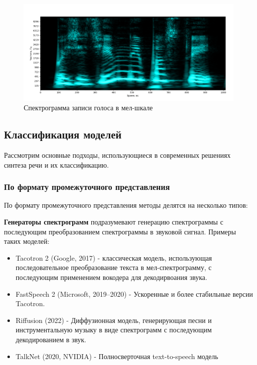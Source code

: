 \begin{figure}
  \centering
  \includegraphics[width=16cm]{figures/mel_spec}
  \caption{Спектрограмма записи голоса в мел-шкале}
  \label{fig:mel_spec}
\end{figure}




\subsection{Классификация моделей}
Рассмотрим основные подходы, использующиеся в современных решениях синтеза речи и их классификацию.


\subsubsection{По формату промежуточного представления}
По формату промежуточного представления методы делятся на несколько типов:

\textbf{Генераторы спектрограмм} подразумевают генерацию спектрограммы с последующим преобразованием спектрограммы в звуковой сигнал. Примеры таких моделей:
\begin{itemize}
  \item Tacotron 2 (Google, 2017) \cite{Tacotron2} - классическая модель, использующая последовательное преобразование текста в мел-спектрограмму, с последующим применением вокодера для декодирвоания звука.
  \item FastSpeech 2 (Microsoft, 2019–2020) \cite{FastSpeech2} - Ускоренные и более стабильные версии Tacotron.
  \item Riffusion (2022) \cite{Riffusion} - Диффузионная модель, генерирующая песни и инструментальную музыку в виде спектрограмм с последующим декодированием в звук.
  \item TalkNet (2020, NVIDIA) \cite{TalkNet} - Полносверточная text-to-speech модель
\end{itemize}

